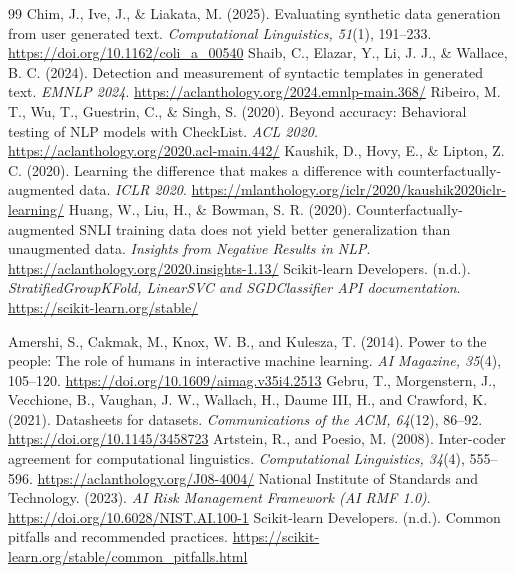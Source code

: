 \begin{thebibliography}{99}
 Chim, J., Ive, J., \& Liakata, M. (2025). Evaluating synthetic data generation from user generated text. \textit{Computational Linguistics, 51}(1), 191--233. \url{https://doi.org/10.1162/coli_a_00540}
 Shaib, C., Elazar, Y., Li, J. J., \& Wallace, B. C. (2024). Detection and measurement of syntactic templates in generated text. \textit{EMNLP 2024}. \url{https://aclanthology.org/2024.emnlp-main.368/}
 Ribeiro, M. T., Wu, T., Guestrin, C., \& Singh, S. (2020). Beyond accuracy: Behavioral testing of NLP models with CheckList. \textit{ACL 2020}. \url{https://aclanthology.org/2020.acl-main.442/}
 Kaushik, D., Hovy, E., \& Lipton, Z. C. (2020). Learning the difference that makes a difference with counterfactually-augmented data. \textit{ICLR 2020}. \url{https://mlanthology.org/iclr/2020/kaushik2020iclr-learning/}
 Huang, W., Liu, H., \& Bowman, S. R. (2020). Counterfactually-augmented SNLI training data does not yield better generalization than unaugmented data. \textit{Insights from Negative Results in NLP}. \url{https://aclanthology.org/2020.insights-1.13/}
 Scikit-learn Developers. (n.d.). \textit{StratifiedGroupKFold, LinearSVC and SGDClassifier API documentation}. \url{https://scikit-learn.org/stable/}

 Amershi, S., Cakmak, M., Knox, W. B., and Kulesza, T. (2014). Power to the people: The role of humans in interactive machine learning. \textit{AI Magazine, 35}(4), 105--120. \url{https://doi.org/10.1609/aimag.v35i4.2513}
 Gebru, T., Morgenstern, J., Vecchione, B., Vaughan, J. W., Wallach, H., Daume III, H., and Crawford, K. (2021). Datasheets for datasets. \textit{Communications of the ACM, 64}(12), 86--92. \url{https://doi.org/10.1145/3458723}
 Artstein, R., and Poesio, M. (2008). Inter-coder agreement for computational linguistics. \textit{Computational Linguistics, 34}(4), 555--596. \url{https://aclanthology.org/J08-4004/}
 National Institute of Standards and Technology. (2023). \textit{AI Risk Management Framework (AI RMF 1.0)}. \url{https://doi.org/10.6028/NIST.AI.100-1}
 Scikit-learn Developers. (n.d.). Common pitfalls and recommended practices. \url{https://scikit-learn.org/stable/common_pitfalls.html}


\end{thebibliography}

